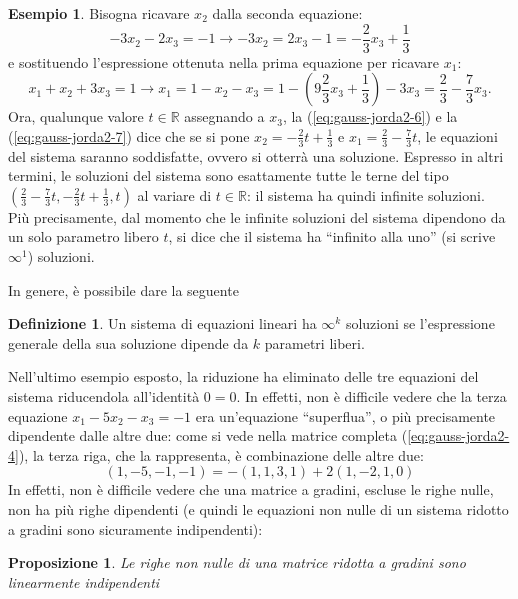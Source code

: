 \documentclass{book}
\theoremstyle{definition}
\newtheorem{defi}{Definizione}[section]
\newtheorem{es}{Esempio}[section]
\theoremstyle{plain}
\newtheorem{prop}{Proposizione}[section]
\begin{document}
\begin{es}
    Bisogna ricavare $x_2$ dalla seconda equazione:
    \begin{equation}
      \label{eq:gauss-jorda2-6}
      -3x_2-2x_3=-1\to -3x_2=2x_3-1=-\frac{2}{3}x_3+\frac{1}{3}
    \end{equation}
    e sostituendo l'espressione ottenuta nella prima equazione per
    ricavare $x_1$:
    \begin{equation}
      \label{eq:gauss-jorda2-7}
      x_1+x_2+3x_3=1\to x_1=1-x_2-x_3=1-\left(9\frac{2}{3}x_3+\frac{1}{3}
        \right)-3x_3=\frac{2}{3}-\frac{7}{3}x_3.
    \end{equation}
    Ora, qualunque valore $t\in \mathds{R}$ assegnando a $x_3$, la
    (\ref{eq:gauss-jorda2-6}) e la (\ref{eq:gauss-jorda2-7}) dice che se
    si pone $x_2=-\frac{2}{3}t+\frac{1}{3}$ e
    $x_1=\frac{2}{3}-\frac{7}{3}t$, le equazioni del sistema saranno
    soddisfatte, ovvero si otterrà una soluzione. Espresso in altri
    termini, le soluzioni del sistema sono esattamente tutte le terne
    del tipo $\left(\frac{2}{3}-\frac{7}{3}t, -\frac{2}{3}t+\frac{1}{3},t
    \right)$ al variare di $t\in \mathds{R}$: il sistema ha quindi
    infinite soluzioni.\\
    Più precisamente, dal momento che le infinite
    soluzioni del sistema dipendono da un solo parametro libero $t$, si
    dice che il sistema ha ``infinito alla uno'' (si scrive $\infty^1$)
    soluzioni.
\end{es}
In genere, è possibile dare la seguente
\begin{defi}
  \label{defi:gauss-jorda1}
  Un sistema di equazioni lineari ha $\infty^k$ soluzioni se
  l'espressione generale della sua soluzione dipende da $k$ parametri
  liberi.
\end{defi}
Nell'ultimo esempio esposto, la riduzione ha eliminato delle tre
equazioni del sistema riducendola all'identità $0=0$. In effetti, non è
difficile vedere che la terza equazione $x_1-5x_2-x_3=-1$ era un'equazione
``superflua'', o più precisamente dipendente dalle altre due: come si
vede nella matrice completa (\ref{eq:gauss-jorda2-4}), la terza riga, che
la rappresenta, è combinazione delle altre due:
\begin{equation*}
  (1,-5,-1,-1)=-(1,1,3,1)+2(1,-2,1,0)
\end{equation*}
In effetti, non è difficile vedere che una matrice a gradini, escluse le
righe nulle, non ha più righe dipendenti (e quindi le equazioni non
nulle di un sistema ridotto a gradini sono sicuramente indipendenti):
\begin{prop}
  \label{prop:gauss-jorda1}
  Le righe non nulle di una matrice ridotta a gradini sono
  linearmente indipendenti
\end{prop}
\end{document}
